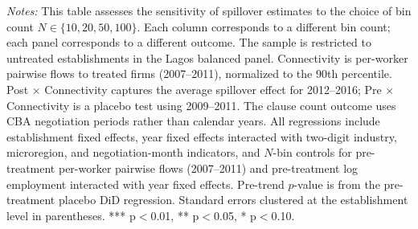 \begin{table}[H]
\begin{threeparttable}
\begin{tablenotes}
\item \textit{Notes:} This table assesses the sensitivity of spillover estimates to the choice of bin count $N \in \{10, 20, 50, 100\}$. Each column corresponds to a different bin count; each panel corresponds to a different outcome. The sample is restricted to untreated establishments in the Lagos balanced panel. Connectivity is per-worker pairwise flows to treated firms (2007--2011), normalized to the 90th percentile. Post $\times$ Connectivity captures the average spillover effect for 2012--2016; Pre $\times$ Connectivity is a placebo test using 2009--2011. The clause count outcome uses CBA negotiation periods rather than calendar years. All regressions include establishment fixed effects, year fixed effects interacted with two-digit industry, microregion, and negotiation-month indicators, and $N$-bin controls for pre-treatment per-worker pairwise flows (2007--2011) and pre-treatment log employment interacted with year fixed effects. Pre-trend $p$-value is from the pre-treatment placebo DiD regression. Standard errors clustered at the establishment level in parentheses. *** p$<$0.01, ** p$<$0.05, * p$<$0.10.
\end{tablenotes}
\end{threeparttable}
\end{table}